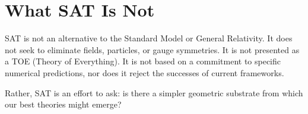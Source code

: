 \documentclass[12pt]{article}
\begin{document}
\section*{What SAT Is Not}

SAT is not an alternative to the Standard Model or General Relativity. It does not seek to eliminate fields, particles, or gauge symmetries. It is not presented as a TOE (Theory of Everything). It is not based on a commitment to specific numerical predictions, nor does it reject the successes of current frameworks.

Rather, SAT is an effort to ask: is there a simpler geometric substrate from which our best theories might emerge?
\end{document}

